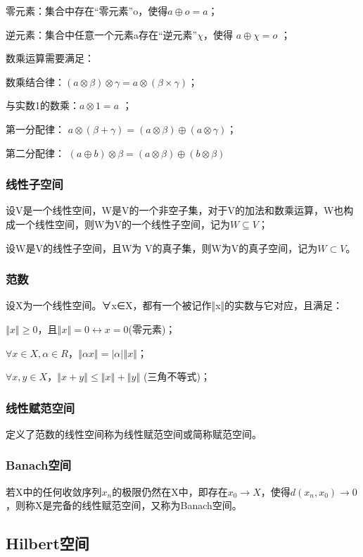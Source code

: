 \documentclass{article}
\begin{document}
零元素：集合中存在“零元素”o，使得$a \oplus o = a $；

逆元素：集合中任意一个元素a存在“逆元素”$\chi$，使得 $a\oplus \chi = o$ ；

数乘运算需要满足：

数乘结合律：$(a \otimes \beta ) \otimes \gamma= a \otimes (\beta \times \gamma)；$

与实数1的数乘：$a \otimes 1= a$ ；

第一分配律： $a \otimes (\beta + \gamma) = (a \otimes \beta) \oplus (a \otimes \gamma ) $；

第二分配律： $(a \oplus b) \otimes \beta = (a \otimes \beta) \oplus (b \otimes \beta )$

\subsubsection{线性子空间}
设V是一个线性空间，W是V的一个非空子集，对于V的加法和数乘运算，W也构成一个线性空间，则W为V的一个线性子空间，记为$W\subseteq V$；

设W是V的线性子空间，且W为 V的真子集，则W为V的真子空间，记为$W\subset V$。

\subsubsection{范数}
设X为一个线性空间。∀x∈X，都有一个被记作‖x‖的实数与它对应，且满足：

$‖x‖\ge 0，且‖x‖=0 \leftrightarrow x=0 $(零元素)；

$\forall x\in X, \alpha\in R， ‖\alpha x‖=|\alpha|‖x‖$；

$\forall x,y\in X，‖x+y‖\le‖x‖+‖y‖$ (三角不等式)；

\subsubsection{线性赋范空间}
定义了范数的线性空间称为线性赋范空间或简称赋范空间。

\subsubsection{Banach空间}
若X中的任何收敛序列${x_n}$的极限仍然在X中，即存在$x_0\longrightarrow X$，使得$d(x_n,x_0)\longrightarrow 0$，则称X是完备的线性赋范空间，又称为Banach空间。

\subsection{Hilbert空间}
\end{document}
